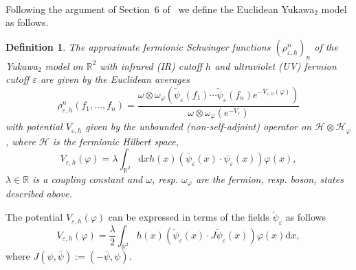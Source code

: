 \documentclass{article}
\newcommand{\assign}{:=}
\newcommand{\mathd}{\mathrm{d}}
\newtheorem{definition}[theorem]{Definition}
\begin{document}
\

Following the argument of Section~6 of~{\cite{osterwalder_euclidean_1973-2}}
we define the Euclidean Yukawa$_2$ model as follows.

\begin{definition}
  \label{def:yukawa2}The approximate fermionic Schwinger functions
  $(\rho^n_{\varepsilon, h})_n$ of the Yukawa$_2$ model on $\mathbb{R}^2$ with
  infrared (IR) cutoff $h$ and ultraviolet (UV) fermion cutoff $\varepsilon$
  are given by the Euclidean averages
  \begin{equation}
    \rho^n_{\varepsilon, h} (f_1, \ldots, f_n) = \frac{\omega \otimes
    \omega_{\varphi} (\tilde{\psi}_{\varepsilon} (f_1) \cdots
    \tilde{\psi}_{\varepsilon} (f_n) e^{- V_{\varepsilon, h}
    (\varphi)})}{\omega \otimes \omega_{\varphi} (e^{- V_{\varepsilon}})}
    \label{eq:euclidean-yukawa-main}
  \end{equation}
  with potential $V_{\varepsilon, h}$ given by the unbounded
  (non-self-adjoint) operator on $\mathcal{H} \otimes \mathcal{H}_{\varphi}$,
  where $\mathcal{H}$ is the fermionic Hilbert space,
  \begin{equation}
    V_{\varepsilon, h} (\varphi) = \lambda \int_{\mathbb{R}^2} \mathd x h (x)
    (\bar{\psi}_{\varepsilon} (x) \cdot \psi_{\varepsilon} (x)) \varphi (x),
    \label{eq:yukawa-potential-boson}
  \end{equation}
  $\lambda \in \mathbb{R}$ is a coupling constant and $\omega$, resp.
  $\omega_{\varphi}$ are the fermion, resp. boson, states described above.
\end{definition}

The potential $V_{\varepsilon, h} (\varphi)$ can be expressed in terms of the
fields $\tilde{\psi}_{\varepsilon}$ as follows
\[ V_{\varepsilon, h} (\varphi) = \frac{\lambda}{2} \int_{\mathbb{R}^2} h (x)
   (\tilde{\psi}_{\varepsilon} (x) \cdot J \widetilde{\psi}_{\varepsilon} (x))
   \varphi (x) \mathd x, \]
where $J (\psi, \bar{\psi}) \assign (- \bar{\psi}, \psi)$.
\end{document}
